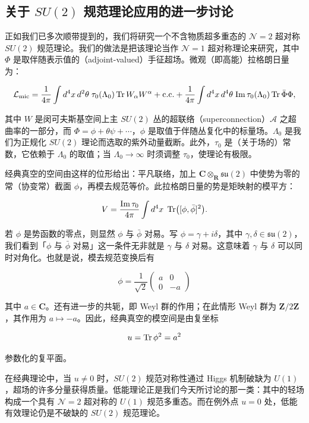 \subsection{关于 $SU(2)$ 规范理论应用的进一步讨论}

正如我们已多次顺带提到的，我们将研究一个不含物质超多重态的 $\mathcal{N}=2$ 超对称 $SU(2)$ 规范理论。我们的做法是把该理论当作 $\mathcal{N}=1$ 超对称理论来研究，其中 $\Phi$ 是取伴随表示值的（adjoint-valued）手征超场。微观（即高能）拉格朗日量为：

\[
  \mathcal{L}_{\text{mic}}
  =\frac{1}{4\pi}\int d^4x\,d^2\theta\;\tau_0(\Lambda_0)\operatorname{Tr} W_\alpha W^\alpha
  +\text{c.c.}
  +\frac{1}{4\pi}\int d^4x\,d^4\theta\;\mathrm{Im}\,\tau_0(\Lambda_0)\operatorname{Tr}\bar\Phi\Phi,
\]

其中 $W$ 是闵可夫斯基空间上主 $SU(2)$ 丛的超联络（superconnection）$\mathcal{A}$ 之超曲率的一部分，而 $\Phi=\phi+\theta\psi+\cdots$，$\phi$ 是取值于伴随丛复化中的标量场。$\Lambda_0$ 是我们为正规化 $SU(2)$ 理论而选取的紫外动量截断。此外，$\tau_0$ 是（关于场的）常数，它依赖于 $\Lambda_0$ 的取值；当 $\Lambda_0\to\infty$ 时须调整 $\tau_0$，使理论有极限。

经典真空的空间由这样的位形给出：平凡联络，加上 $\mathbf{C}\otimes_{\mathbf{R}}\mathfrak{su}(2)$ 中使势为零的常（协变常）截面 $\phi$，再模去规范等价。此拉格朗日量的势是矩映射的模平方：

\[
  V=\frac{\mathrm{Im}\,\tau_0}{4\pi}\int d^4x\;\operatorname{Tr}\bigl([\phi,\bar\phi]^2\bigr).
\]

若 $\phi$ 是势函数的零点，则显然 $\phi$ 与 $\bar\phi$ 对易。写 $\phi=\gamma+i\delta$，其中 $\gamma,\delta\in\mathfrak{su}(2)$，我们看到「$\phi$ 与 $\bar\phi$ 对易」这一条件无非就是 $\gamma$ 与 $\delta$ 对易。这意味着 $\gamma$ 与 $\delta$ 可以同时对角化。也就是说，模去规范变换后有

\[
  \phi=\frac{1}{\sqrt2}
  \begin{pmatrix} a & 0\\ 0 & -a\end{pmatrix}
\]

其中 $a\in\mathbf{C}$。还有进一步的共轭，即 Weyl 群的作用；在此情形 Weyl 群为 $\mathbf{Z}/2\mathbf{Z}$，其作用为 $a\mapsto-a$。因此，经典真空的模空间是由复坐标

\[
  u=\operatorname{Tr}\phi^2=a^2
\]

参数化的复平面。

在经典理论中，当 $u\ne0$ 时，$SU(2)$ 规范对称性通过 Higgs 机制破缺为 $U(1)$，超场的许多分量获得质量。低能理论正是我们今天所讨论的那一类：其中的轻场构成一个具有 $\mathcal{N}=2$ 超对称的 $U(1)$ 规范多重态。而在例外点 $u=0$ 处，低能有效理论仍是不破缺的 $SU(2)$ 规范理论。

